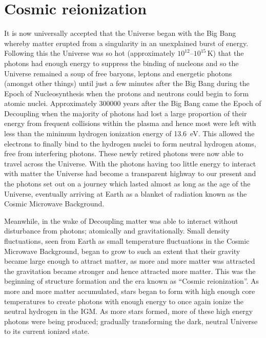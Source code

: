 
\section{Cosmic reionization} %
\label{sec:cosmic_re_ionisation}
	It is now universally accepted that the Universe began with the Big Bang whereby matter erupted from a singularity in an unexplained burst of energy. Following this the Universe was so hot (approximately $10^{12}$--$10^{15}$\,\si{\kelvin}\cite{liddle2003introduction}) that the photons had enough energy to suppress the binding of nucleons and so the Universe remained a soup of free baryons, leptons and energetic photons (amongst other things) until just a few minutes after the Big Bang during the Epoch of Nucleosynthesis when the protons and neutrons could begin to form atomic nuclei. Approximately \num{300000} years after the Big Bang came the Epoch of Decoupling when the majority of photons had lost a large proportion of their energy from frequent collisions within the plasma and hence most were left with less than the minimum hydrogen ionization energy of \SI{13.6}{\electronvolt}\cite{liddle2003introduction}. This allowed the electrons to finally bind to the hydrogen nuclei to form neutral hydrogen atoms, free from interfering photons. These newly retired photons were now able to travel across the Universe. With the photons having too little energy to interact with matter the Universe had become a transparent highway to our present and the photons set out on a journey which lasted almost as long as the age of the Universe, eventually arriving at Earth as a blanket of radiation known as the Cosmic Microwave Background.

	Meanwhile, in the wake of Decoupling matter was able to interact without disturbance from photons; atomically and gravitationally. Small density fluctuations, seen from Earth as small temperature fluctuations in the Cosmic Microwave Background, began to grow to such an extent that their gravity became large enough to attract matter, as more and more matter was attracted the gravitation became stronger and hence attracted more matter. This was the beginning of structure formation and the era known as ``Cosmic reionization''. As more and more matter accumulated, stars began to form with high enough core temperatures to create photons with enough energy to once again ionize the neutral hydrogen in the IGM. As more stars formed, more of these high energy photons were being produced; gradually transforming the dark, neutral Universe to its current ionized state.

